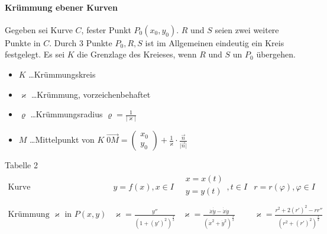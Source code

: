 \documentclass[a4paper]{scrartcl}
\begin{document}
\paragraph{Krümmung ebener Kurven}
Gegeben sei Kurve $C$, fester Punkt $P_0 (x_0,y_0)$. $R$ und $S$ seien zwei weitere Punkte in $C$. Durch 3 Punkte $P_0,R,S$ ist im Allgemeinen eindeutig ein Kreis festgelegt. Es sei $K$ die Grenzlage des Kreieses, wenn $R$ und $S$ un $P_0$ übergehen.\\
\begin{itemize}
\item $K$ \dots Krümmungskreis
\item $\varkappa$ \dots Krümmung, vorzeichenbehaftet
\item $\varrho$ \dots Krümmungsradius $\varrho = \frac{1}{\lvert \varkappa \rvert}$
\item $M$ \dots Mittelpunkt von $K \;  \overrightarrow{0M} = \begin{pmatrix} x_0 \\ y_0 \end{pmatrix} + \frac{1}{\varkappa} \cdot \frac{\vec{n}}{\lvert \vec{n} \rvert}$
\end{itemize}

Tabelle 2\\
$\begin{array}{l|c|c|c}
\text{Kurve} & y=f(x), x \in I & \begin{array}{c} x = x(t)\\ y = y(t) \\ \end{array} , t \in I & r = r(\varphi), \varphi \in I\\ \hline
\text{Krümmung } \varkappa \text{ in } P(x,y) & \varkappa = \frac{y''}{(1+(y')^2)^{\frac{3}{2}}} & \varkappa = \frac{\dot{x} \dot{\dot{y}} - \dot{\dot{x}} \dot{y}}{(\dot{x}^2 + \dot{y}^2)^{\frac{3}{2}}} & \varkappa = \frac{r^2 + 2(r')^2 - rr''}{(r^2+(r')^2)^{\frac{3}{2}}} \\
\end{array}$
\end{document}
